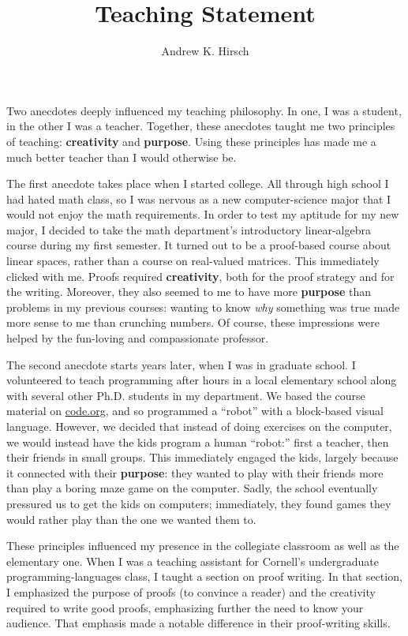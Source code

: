 \documentclass{article}
\author{Andrew K. Hirsch}
\title{Teaching Statement}
\date{}
\theoremstyle{definition}
\begin{document}
\maketitle

Two anecdotes deeply influenced my teaching philosophy.
In one, I was a student, in the other I was a teacher.
Together, these anecdotes taught me two principles of teaching: \textbf{creativity} and \textbf{purpose}.
Using these principles has made me a much better teacher than I would otherwise be.

The first anecdote takes place when I started college.
All through high school I had hated math class, so I was nervous as a new computer-science major that I would not enjoy the math requirements.
In order to test my aptitude for my new major, I decided to take the math department's introductory linear-algebra course during my first semester.
It turned out to be a proof-based course about linear spaces, rather than a course on real-valued matrices.
This immediately clicked with me.
Proofs required \textbf{creativity}, both for the proof strategy and for the writing.
Moreover, they also seemed to me to have more \textbf{purpose} than problems in my previous courses: wanting to know \emph{why} something was true made more sense to me than crunching numbers.
Of course, these impressions were helped by the fun-loving and compassionate professor.

The second anecdote starts years later, when I was in graduate school.
I volunteered to teach programming after hours in a local elementary school along with several other Ph.D. students in my department.
We based the course material on \href{https://www.code.org}{code.org}, and so programmed a ``robot'' with a block-based visual language.
However, we decided that instead of doing exercises on the computer, we would instead have the kids program a human ``robot:'' first a teacher, then their friends in small groups.
This immediately engaged the kids, largely because it connected with their \textbf{purpose}: they wanted to play with their friends more than play a boring maze game on the computer.
Sadly, the school eventually pressured us to get the kids on computers; immediately, they found games they would rather play than the one we wanted them to.

These principles influenced my presence in the collegiate classroom as well as the elementary one.
When I was a teaching assistant for Cornell's undergraduate programming-languages class, I taught a section on proof writing.
In that section, I emphasized the purpose of proofs (to convince a reader) and the creativity required to write good proofs, emphasizing further the need to know your audience.
That emphasis made a notable difference in their proof-writing skills.
\end{document}
